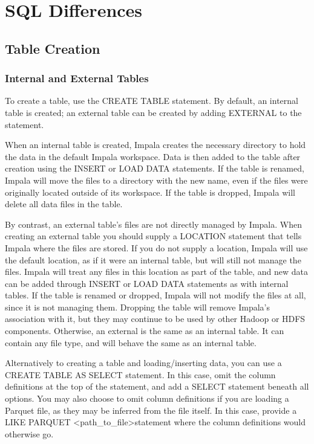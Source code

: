 \documentclass[onecolumn, draftclsnofoot,10pt, compsoc]{IEEEtran}
\begin{document}
\section{SQL Differences}
    \subsection{Table Creation}
        \subsubsection{Internal and External Tables}
To create a table, use the CREATE TABLE statement.
By default, an internal table is created; an external table can be created by adding EXTERNAL to the statement. 

When an internal table is created, Impala creates the necessary directory to hold the data in the default Impala workspace.
Data is then added to the table after creation using the INSERT or LOAD DATA statements.
If the table is renamed, Impala will move the files to a directory with the new name, even if the files were originally located outside of its workspace.
If the table is dropped, Impala will delete all data files in the table. 

By contrast, an external table’s files are not directly managed by Impala.
When creating an external table you should supply a LOCATION statement that tells Impala where the files are stored. 
If you do not supply a location, Impala will use the default location, as if it were an internal table, but will still not manage the files. 
Impala will treat any files in this location as part of the table, and new data can be added through INSERT or LOAD DATA statements as with internal tables. 
If the table is renamed or dropped, Impala will not modify the files at all, since it is not managing them. 
Dropping the table will remove Impala’s association with it, but they may continue to be used by other Hadoop or HDFS components. 
Otherwise, an external is the same as an internal table. It can contain any file type, and will behave the same as an internal table.

Alternatively to creating a table and loading/inserting data, you can use a CREATE TABLE AS SELECT statement.
In this case, omit the column definitions at the top of the statement, and add a SELECT statement beneath all options. 
You may also choose to omit column definitions if you are loading a Parquet file, as they may be inferred from the file itself.
In this case, provide a LIKE PARQUET \textless path\_to\_file\textgreater  statement where the column definitions would otherwise go.
\end{document}
